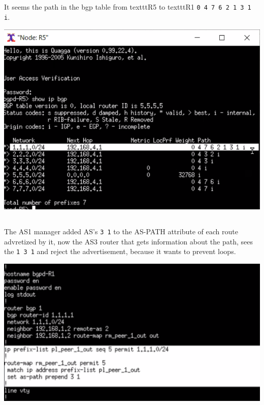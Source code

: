 \subsection{}
It seems the path in the bgp table from texttt{R5} to texttt{R1} \texttt{0 4 7 6 2 1 3 1 i}.
\begin{center}
    \includegraphics[width=1.2 \textwidth]{resources/q4-2.png}\centering
\end{center}

\subsection{}
The AS1 manager added AS's \texttt{3 1} to the AS-PATH attribute of each route advretized by it, now the AS3 router
that gets information about the path, sees the \texttt{1 3 1} and reject the 
advertisement, because it wants to prevent loops.
\begin{center}
    \includegraphics[width=1.2 \textwidth]{resources/q4-3.png}\centering
\end{center}

